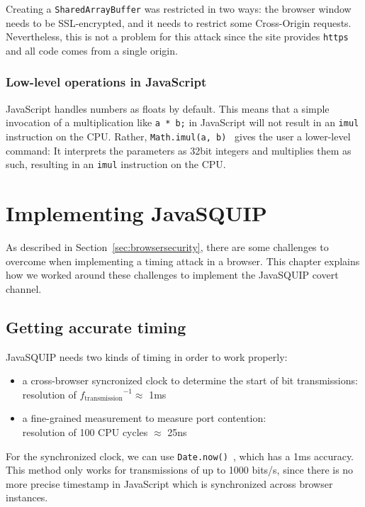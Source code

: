 \documentclass[11pt,
  titlepage=false,
]{scrreprt}
\begin{document}
Creating a \texttt{SharedArrayBuffer} was restricted in two ways: the browser window needs to be SSL-encrypted, and it needs to restrict some Cross-Origin requests.
Nevertheless, this is not a problem for this attack since the site provides \texttt{https} and all code comes from a single origin.


\subsection{Low-level operations in JavaScript}\label{subsec:lowleveljs}
JavaScript handles numbers as floats by default.
This means that a simple invocation of a multiplication like \texttt{a * b;} in JavaScript will not result in an \texttt{imul} instruction on the CPU.
Rather, \texttt{Math.imul(a, b)}~\cite{mathimul} gives the user a lower-level command:
It interprets the parameters as 32bit integers and multiplies them as such, resulting in an \texttt{imul} instruction on the CPU.


\chapter{Implementing JavaSQUIP}
\label{ch:implementation}
As described in Section~\ref{sec:browsersecurity}, there are some challenges to overcome when implementing a timing attack in a browser.
This chapter explains how we worked around these challenges to implement the JavaSQUIP covert channel.

\section{Getting accurate timing}
\label{sec:accurate-timing}
JavaSQUIP needs two kinds of timing in order to work properly:
\begin{itemize}
    \item a cross-browser syncronized clock to determine the start of bit transmissions:\\
    resolution of ${f_{\text{transmission}}}^{-1} \approx$ 1ms
    \item a fine-grained measurement to measure port contention:\\
    resolution of 100 CPU cycles $\approx$ 25ns
\end{itemize}

For the synchronized clock, we can use \texttt{Date.now()}~\cite{datenow}, which has a 1ms accuracy.
This method only works for transmissions of up to 1000 bits/s, since there is no more precise timestamp in JavaScript which is synchronized across browser instances.
\end{document}
